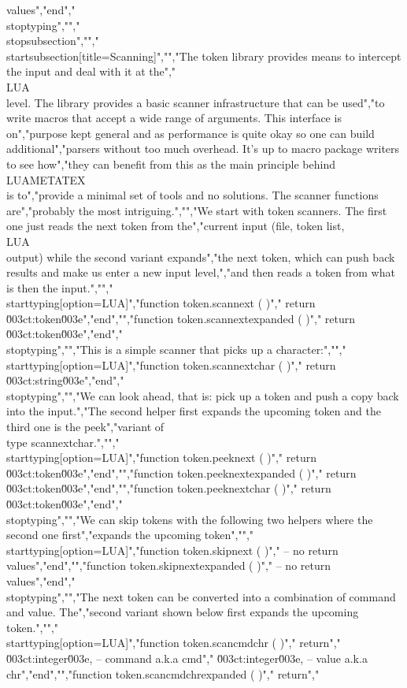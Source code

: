 values","end","\\stoptyping","","\\stopsubsection","","\\startsubsection[title={Scanning}]","","The token library provides means to intercept the input and deal with it at the","\\LUA\\ level. The library provides a basic scanner infrastructure that can be used","to write macros that accept a wide range of arguments. This interface is on","purpose kept general and as performance is quite okay so one can build additional","parsers without too much overhead. It's up to macro package writers to see how","they can benefit from this as the main principle behind \\LUAMETATEX\\ is to","provide a minimal set of tools and no solutions. The scanner functions are","probably the most intriguing.","","We start with token scanners. The first one just reads the next token from the","current input (file, token list, \\LUA\\ output) while the second variant expands","the next token, which can push back results and make us enter a new input level,","and then reads a token from what is then the input.","","\\starttyping[option=LUA]","function token.scannext ( )","    return \u003ct:token\u003e","end","","function token.scannextexpanded ( )","    return \u003ct:token\u003e","end","\\stoptyping","","This is a simple scanner that picks up a character:","","\\starttyping[option=LUA]","function token.scannextchar ( )","    return \u003ct:string\u003e","end","\\stoptyping","","We can look ahead, that is: pick up a token and push a copy back into the input.","The second helper first expands the upcoming token and the third one is the peek","variant of \\type {scannextchar}.","","\\starttyping[option=LUA]","function token.peeknext ( )","    return \u003ct:token\u003e","end","","function token.peeknextexpanded ( )","    return \u003ct:token\u003e","end","","function token.peeknextchar ( )","    return \u003ct:token\u003e","end","\\stoptyping","","We can skip tokens with the following two helpers where the second one first","expands the upcoming token","","\\starttyping[option=LUA]","function token.skipnext ( )","    -- no return values","end","","function token.skipnextexpanded ( )","    -- no return values","end","\\stoptyping","","The next token can be converted into a combination of command and value. The","second variant shown below first expands the upcoming token.","","\\starttyping[option=LUA]","function token.scancmdchr ( )","    return","        \u003ct:integer\u003e, -- command a.k.a cmd","        \u003ct:integer\u003e, -- value   a.k.a chr","end","","function token.scancmdchrexpanded ( )","    return","        
